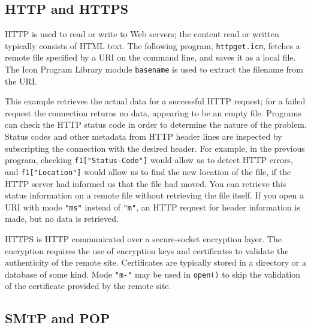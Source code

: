 \subsection*{HTTP and HTTPS}

HTTP is used to read or write to Web servers; the content
read or written typically consists of HTML text. The
following program, \texttt{httpget.icn}, fetches a remote file
specified by a URI on the command line, and saves it as a local file.
The Icon Program Library module \texttt{basename} is used to extract
the filename from the URI.



This example retrieves the actual data for a successful HTTP request;
for a failed request the connection returns no data, appearing to be an
empty file. Programs can check the HTTP status code in order to
determine the nature of the problem. Status codes and other metadata
from HTTP header lines are inspected by subscripting the connection
with the desired header. For example, in the previous program, checking
\texttt{f1["Status-Code"]} would allow us
to detect HTTP errors, and
\texttt{f1["Location"]} would allow us to
find the new location of the file, if the HTTP server had informed us
that the file had moved. You can retrieve this status information on a
remote file without retrieving the file itself. If you open a URI with
mode \texttt{"ms"} instead of
\texttt{"m"}, an HTTP request for header
information is made, but no data is retrieved.

HTTPS is HTTP communicated over a secure-socket
encryption layer. The encryption requires the use of encryption keys
and certificates to validate the authenticity of the remote site.
Certificates are typically stored in a directory or a
database of some kind. Mode \texttt{"m-"} may be used in
\texttt{open()} to skip the validation of the certificate provided
by the remote site.

\subsection*{SMTP and POP}

